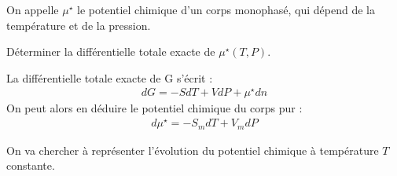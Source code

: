 \begin{exercise}


On appelle $\mu^\star$ le potentiel chimique d'un corps monophasé, qui dépend de la température et de la pression.

\begin{questions}
\question Déterminer la différentielle totale exacte de $\mu^\star (T, P)$.
\begin{solution}
La différentielle totale exacte de G s'écrit : 
\begin{align*}
dG = -S dT + V dP + \mu^\star dn
\end{align*}
On peut alors en déduire le potentiel chimique du corps pur : 
\begin{align*}
d\mu^\star = -S_m dT + V_m dP
\end{align*}
\end{solution}


On va chercher à représenter l'évolution du potentiel chimique à température $T$ constante.


\end{questions}
\end{exercise}
